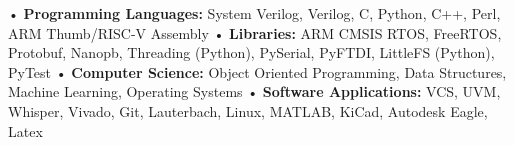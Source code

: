 \documentclass[../main.tex]{subfiles}
\begin{document}
%
%
{\fontsize{\textFontSize}{\textFontBox}\selectfont • \hspace{1mm} \textbf{Programming Languages:} System Verilog, Verilog, C, Python, C++, Perl, ARM Thumb/RISC-V Assembly }\newline
{\fontsize{\textFontSize}{\textFontBox}\selectfont • \hspace{1mm} \textbf{Libraries:} ARM CMSIS RTOS, FreeRTOS, Protobuf, Nanopb, Threading (Python), PySerial, PyFTDI, LittleFS (Python), PyTest }\newline
{\fontsize{\textFontSize}{\textFontBox}\selectfont • \hspace{1mm} \textbf{Computer Science:} Object Oriented Programming, Data Structures, Machine Learning, Operating Systems }\newline
{\fontsize{\textFontSize}{\textFontBox}\selectfont • \hspace{1mm} \textbf{Software Applications:} VCS, UVM, Whisper, Vivado, Git, Lauterbach, Linux, MATLAB, KiCad, Autodesk Eagle, Latex}\newline
%
%
\end{document}
